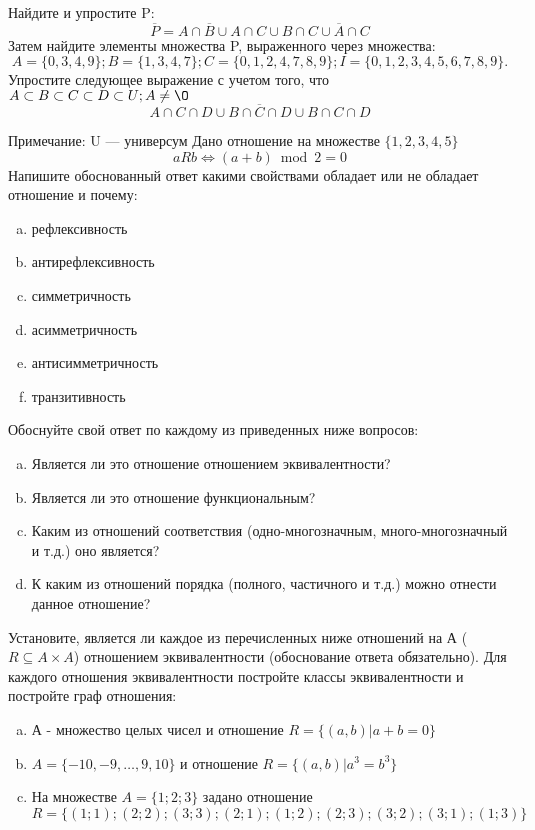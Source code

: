 \documentclass[10pt]{exam}
\begin{document}
\begin{questions}
\question
Найдите и упростите P:
\begin{equation*}
\overline{P} = A \cap \overline{B} \cup A \cap C \cup B \cap C \cup \overline{A} \cap C
\end{equation*}
Затем найдите элементы множества P, выраженного через множества:
\begin{equation*}
A = \{0, 3, 4, 9\}; 
B = \{1, 3, 4, 7\};
C = \{0, 1, 2, 4, 7, 8, 9\};
I = \{0, 1, 2, 3, 4, 5, 6, 7, 8, 9\}.
\end{equation*}\question
Упростите следующее выражение с учетом того, что $A\subset B \subset C \subset D \subset U; A \neq \O$
\begin{equation*}
A \cap C  \cap D \cup B \cap \overline{C} \cap D \cup B \cap C \cap D
\end{equation*}

Примечание: U — универсум\question
Дано отношение на множестве $\{1, 2, 3, 4, 5\}$ 
\begin{equation*}
aRb \iff (a+b) \bmod 2 =0
\end{equation*}
Напишите обоснованный ответ какими свойствами обладает или не обладает отношение и почему:   
\begin{enumerate} [a)]\setcounter{enumi}{0}
\item рефлексивность
\item антирефлексивность
\item симметричность
\item асимметричность
\item антисимметричность
\item транзитивность
\end{enumerate}

Обоснуйте свой ответ по каждому из приведенных ниже вопросов:
\begin{enumerate} [a)]\setcounter{enumi}{0}
    \item Является ли это отношение отношением эквивалентности?
    \item Является ли это отношение функциональным?
    \item Каким из отношений соответствия (одно-многозначным, много-многозначный и т.д.) оно является?
    \item К каким из отношений порядка (полного, частичного и т.д.) можно отнести данное отношение?
\end{enumerate}



\question
Установите, является ли каждое из перечисленных ниже отношений на А ($R \subseteq A \times A$) отношением эквивалентности (обоснование ответа обязательно). Для каждого отношения эквивалентности 
постройте классы эквивалентности и постройте граф отношения:
\begin{enumerate}[a)]\setcounter{enumi}{0}
\item А - множество целых чисел и отношение $R = \{(a,b)|a + b = 0\}$
\item $A = \{-10, -9, …, 9, 10\}$ и отношение $R = \{(a,b)|a^{3} = b^{3}\}$
\item На множестве $A = \{1; 2; 3\}$ задано отношение $R = \{(1; 1); (2; 2); (3; 3); (2; 1); (1; 2); (2; 3); (3; 2); (3; 1); (1; 3)\}$


\end{enumerate}
\end{questions}
\end{document}
